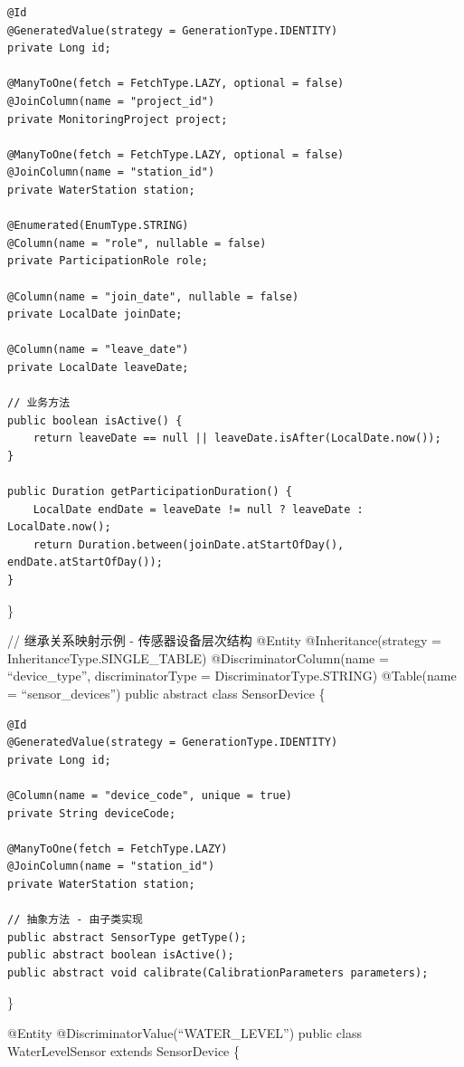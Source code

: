 \begin{verbatim}
@Id
@GeneratedValue(strategy = GenerationType.IDENTITY)
private Long id;

@ManyToOne(fetch = FetchType.LAZY, optional = false)
@JoinColumn(name = "project_id")
private MonitoringProject project;

@ManyToOne(fetch = FetchType.LAZY, optional = false)  
@JoinColumn(name = "station_id")
private WaterStation station;

@Enumerated(EnumType.STRING)
@Column(name = "role", nullable = false)
private ParticipationRole role;

@Column(name = "join_date", nullable = false)
private LocalDate joinDate;

@Column(name = "leave_date")
private LocalDate leaveDate;

// 业务方法
public boolean isActive() {
    return leaveDate == null || leaveDate.isAfter(LocalDate.now());
}

public Duration getParticipationDuration() {
    LocalDate endDate = leaveDate != null ? leaveDate : LocalDate.now();
    return Duration.between(joinDate.atStartOfDay(), endDate.atStartOfDay());
}
\end{verbatim}

\}

// 继承关系映射示例 - 传感器设备层次结构 @Entity @Inheritance(strategy = InheritanceType.SINGLE\_TABLE) @DiscriminatorColumn(name = ``device\_type'', discriminatorType = DiscriminatorType.STRING) @Table(name = ``sensor\_devices'') public abstract class SensorDevice \{

\begin{verbatim}
@Id
@GeneratedValue(strategy = GenerationType.IDENTITY)
private Long id;

@Column(name = "device_code", unique = true)
private String deviceCode;

@ManyToOne(fetch = FetchType.LAZY)
@JoinColumn(name = "station_id")
private WaterStation station;

// 抽象方法 - 由子类实现
public abstract SensorType getType();
public abstract boolean isActive();
public abstract void calibrate(CalibrationParameters parameters);
\end{verbatim}

\}

@Entity @DiscriminatorValue(``WATER\_LEVEL'') public class WaterLevelSensor extends SensorDevice \{

